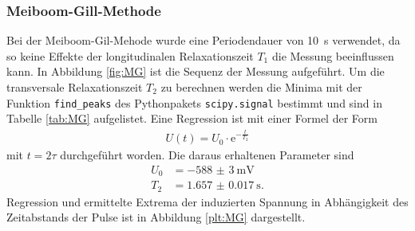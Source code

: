 \subsubsection{Meiboom-Gill-Methode}
Bei der Meiboom-Gil-Mehode wurde eine Periodendauer von \SI{10}{\second}
verwendet, da so keine Effekte der longitudinalen Relaxationszeit $T_1$ die
Messung beeinflussen kann. In Abbildung \ref{fig:MG} ist die Sequenz der Messung
aufgeführt.
%
Um die transversale Relaxationszeit $T_2$ zu berechnen werden die Minima mit der
Funktion \texttt{find\_peaks} des Pythonpakets \texttt{scipy.signal} bestimmt und
sind in Tabelle \ref{tab:MG} aufgelistet.
Eine Regression ist mit einer Formel
der Form
\begin{align*}
  U(t) = U_0 \cdot \text{e}^{-\frac{t}{T_2}}
\end{align*}
mit $t = 2\tau$ durchgeführt worden. Die daraus erhaltenen Parameter sind
\begin{align*}
  U_0 &= -\SI{588(3)}{\milli\volt} \\
  T_2 &= \SI{1.657(17)}{\second}.
\end{align*}
Regression und ermittelte Extrema der induzierten Spannung in Abhängigkeit des
Zeitabstands der Pulse ist in Abbildung \ref{plt:MG} dargestellt.
\FloatBarrier

